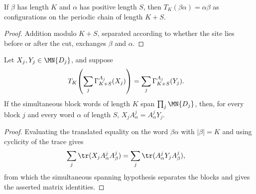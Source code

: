 \begin{lemma}
    \label{lem:parent_cyclic_translate_append}
    \leanok
    If $\beta$ has length $K$ and $\alpha$ has positive length $S$, then
    $T_K(\beta\alpha)=\alpha\beta$ as configurations on the periodic chain of
    length $K+S$.
\end{lemma}

\begin{proof}
    \leanok
    Addition modulo $K+S$, separated according to whether the site
    lies before or after the cut, exchanges $\beta$ and $\alpha$.
\end{proof}

\begin{lemma}
    \label{lem:block_boundary_intertwiner_from_global_cut}
    \leanok
    Let $X_j,Y_j\in\MN{D_j}$, and suppose
    \begin{align}
        T_K\!\left(\sum_j\Gamma_{K+S}^{A_j}(X_j)\right)
         & =
        \sum_j\Gamma_{K+S}^{A_j}(Y_j).
        \notag
    \end{align}
    If the simultaneous block words of length $K$ span
    $\prod_j\MN{D_j}$, then, for every block $j$ and every word $\alpha$ of
    length $S$,
    $X_jA^j_\alpha = A^j_\alpha Y_j$.
\end{lemma}

\begin{proof}
    \leanok
    Evaluating the translated equality on the word $\beta\alpha$ with
    $|\beta|=K$ and using cyclicity of the trace gives
    \begin{align}
        \sum_j\tr(X_jA^j_\alpha A^j_\beta)
         & =
        \sum_j\tr(A^j_\alpha Y_jA^j_\beta),
        \notag
    \end{align}
    from which the simultaneous spanning hypothesis separates the blocks and
    gives the asserted matrix identities.
\end{proof}

